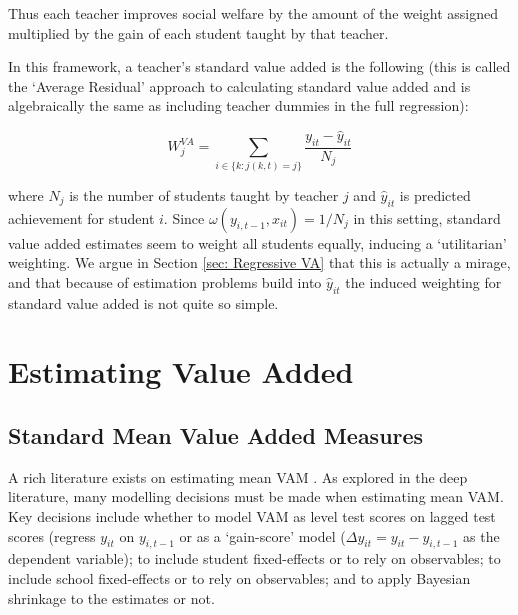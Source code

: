 \documentclass[letterpaper,12pt]{article}
\begin{document}
\noindent Thus each teacher improves social welfare by the amount of the weight assigned multiplied by the gain of each student taught by that teacher.

In this framework, a teacher's standard value added is the following (this is called the `Average Residual' approach to calculating standard value added and is algebraically the same as including teacher dummies in the full regression):
    
    \begin{equation*}
        W_j^{VA} = \sum_{i \in \{k : j(k, t) = j\} } \frac{y_{it} - \hat{y}_{it}}{N_j}
    \end{equation*}

\noindent where $N_j$ is the number of students taught by teacher $j$ and $\hat{y}_{it}$ is predicted achievement for student $i$. Since $\omega(y_{i,t-1}, x_{it}) = 1/N_j$ in this setting, standard value added estimates seem to weight all students equally, inducing a `utilitarian' weighting. We argue in Section \ref{sec: Regressive VA} that this is actually a mirage, and that because of estimation problems build into $\hat{y}_{it}$ the induced weighting for standard value added is not quite so simple.




\section{Estimating Value Added}\label{sec: Estimation}

\subsection{Standard Mean Value Added Measures}

A rich literature exists on estimating mean VAM \citep[see, for example,][]{Koedel2015,chetty2014measuring1,guarino2015can,guarino2015evaluation, dieterle2015principals}. As explored in the deep literature, many modelling decisions must be made when estimating mean VAM. Key decisions include whether to model VAM as level test scores on lagged test scores (regress $y_{it}$ on $y_{i,t-1}$ or as a `gain-score' model ($\Delta y_{it} = y_{it} - y_{i,t-1}$ as the dependent variable); to include student fixed-effects or to rely on observables; to include school fixed-effects or to rely on observables; and to apply Bayesian shrinkage to the estimates or not.
\end{document}
